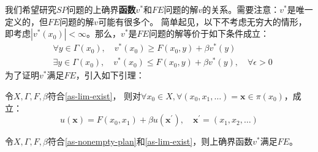 我们希望研究$SP$问题的上确界\textbf{函数}$v^*$和$FE$问题的解$v$的关系。需要注意：$v^*$是唯一定义的，但$FE$问题的解$v$可能有很多个。
简单起见，以下不考虑无穷大的情形，即考虑$\left|v^*\left(x_0\right)\right| < \infty$。那么，$v^*$是$FE$问题的解等价于如下条件成立：
$$
\begin{aligned}
    &\forall y \in \Gamma\left(x_0\right),\quad v^*\left(x_0\right)\geq F\left(x_0,y\right) + \beta v^*\left(y\right)\\
    &\exists y\in \Gamma\left(x_0\right),\quad v^*\left(x_0\right)\leq F\left(x_0,y\right) + \beta v^*\left(y\right), 
        \quad \forall \epsilon > 0
\end{aligned}
$$
为了证明$v^*$满足$FE$，引入如下引理：
\begin{lemma}
    令$X, \Gamma, F, \beta$符合\cref{as-lim-exist}，
    则对$\forall x_0 \in X, \forall \left(x_0,x_1,\dots\right)=\boldsymbol{x}\in\pi\left(x_0\right)$，成立：
    \begin{equation*}
        u\left(\boldsymbol{x}\right)=
            F\left(x_0,x_1\right)+\beta u\left(\boldsymbol{x}^{\prime}\right), \quad \boldsymbol{x}^{\prime}
                =\left(x_1,x_2,\dots\right)
    \end{equation*}
\end{lemma}
\begin{theorem}[SP-FE] \label{th-solution-sp-fe}
    令$X, \Gamma, F, \beta$符合\cref{as-nonempty-plan}和\cref{as-lim-exist}，则上确界函数$v^*$满足$FE$。
\end{theorem}
